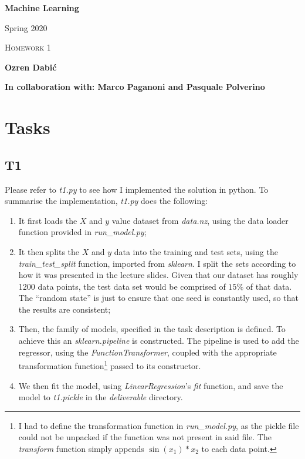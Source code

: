 \documentclass[12pt,a4paper]{article}
\begin{document}
\begin{center}
  
  \bigskip \bigskip

  {\huge \textbf{Machine Learning}}

  \bigskip
  
  {\large Spring 2020}

  \bigskip \bigskip

  {\large \textsc{Homework 1}} 
  
  \bigskip \bigskip
  
  {\large \textbf{Ozren Dabić}}
  
  \bigskip \bigskip
  
  {\small \textbf{In collaboration with: Marco Paganoni and Pasquale Polverino}}
  
  \bigskip \bigskip

\end{center}

\section*{Tasks}
\subsection*{T1}

Please refer to \textit{t1.py} to see how I implemented the solution in python. To summarise the implementation, \textit{t1.py} does the following:
\begin{enumerate}
\itemsep-0.25em 
	\item It first loads the $X$ and $y$ value dataset from \textit{data.nz}, using the data loader function provided in \textit{run\_model.py};
	\item It then splits the $X$ and $y$ data into the training and test sets, using the \textit{train\_test\_split} function, imported from \textit{sklearn}. I split the sets according to how it was presented in the lecture slides. Given that our dataset has roughly 1200 data points, the test data set would be comprised of $15\%$ of that data. The ``random state'' is just to ensure that one seed is constantly used, so that the results are consistent;
	\item Then, the family of models, specified in the task description is defined. To achieve this an \textit{sklearn.pipeline} is constructed. The pipeline is used to add the regressor, using the \textit{FunctionTransformer}, coupled with the appropriate transformation function\footnote{I had to define the transformation function in \textit{run\_model.py}, as the pickle file could not be unpacked if the function was not present in said file. The \textit{transform} function simply appends $\sin(x_1) * x_2$ to each data point.} passed to its constructor.
	\item We then fit the model, using \textit{LinearRegression}'s \textit{fit} function, and save the model to \textit{t1.pickle} in the \textit{deliverable} directory.
\end{enumerate}
\end{document}
